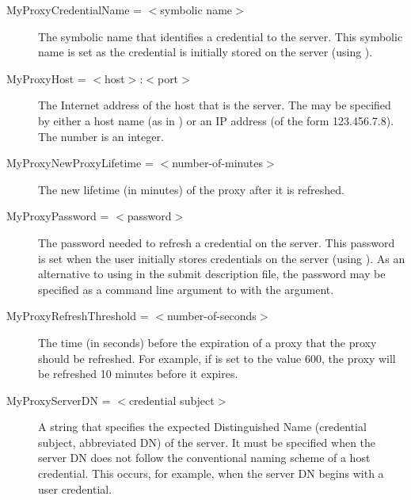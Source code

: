 \begin{description}

\item[MyProxyCredentialName = $<$symbolic name$>$]
The symbolic name that identifies a credential to the  server.
This symbolic name is set as the credential is
initially stored on the server (using ).



\item[MyProxyHost = $<$host$>$:$<$port$>$]
The Internet address of the host that is the  server.
The  may be specified by either a host name
(as in ) or an IP address
(of the form 123.456.7.8).
The  number is an integer.


\item[MyProxyNewProxyLifetime = $<$number-of-minutes$>$]
The new lifetime (in minutes) of the proxy after it is refreshed.


\item[MyProxyPassword = $<$password$>$]
The password needed to refresh a credential on the  server.
This password is set when the user initially stores
credentials on the server (using ).
As an alternative to using  in the
submit description file,
the password may be specified as a command line argument to 
with the  argument.


\item[MyProxyRefreshThreshold = $<$number-of-seconds$>$]
The time (in seconds) before the expiration of a proxy 
that the proxy should be refreshed.
For example, if  is set to the
value 600, the proxy will be refreshed 10 minutes before
it expires.


\item[MyProxyServerDN = $<$credential subject$>$]
A string that specifies the expected Distinguished Name (credential subject,
abbreviated DN)
of the  server.
It must be specified when the  server
DN does not follow the
conventional naming scheme of a host credential.
This occurs, for
example, when the   server DN begins with a user credential.



\end{description}
